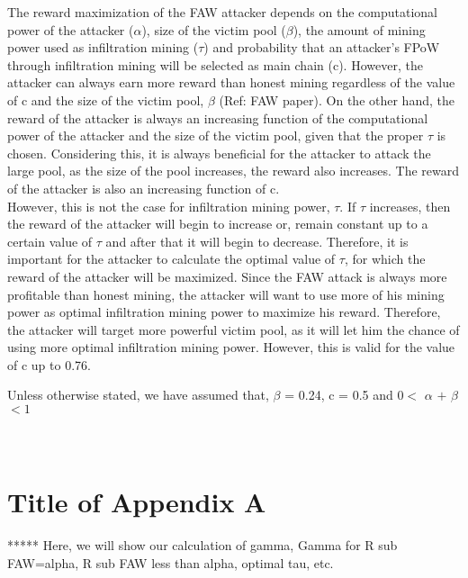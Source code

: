 \documentclass[runningheads]{llncs}
\begin{document}
The reward maximization of the FAW attacker depends on the computational power of the attacker ($\alpha$), size of the victim pool ($\beta$), the amount of mining power used as infiltration mining ($\tau$) and probability that an attacker’s FPoW through infiltration mining will be selected as main chain (c). However, the attacker can always earn more reward than honest mining regardless of the value of c and the size of the victim pool, $\beta$ (Ref: FAW paper). On the other hand, the reward of the attacker is always an increasing function of the computational power of the attacker and the size of the victim pool, given that the proper $\tau$ is chosen. Considering this, it is always beneficial for the attacker to attack the large pool, as the size of the pool increases, the reward also increases. The reward of the attacker is also an increasing function of c.  \\


However, this is not the case for infiltration mining power, $\tau$. If $\tau$ increases, then the reward of the attacker will begin to increase or, remain constant up to a certain value of $\tau$ and after that it will begin to decrease. Therefore, it is important for the attacker to calculate the optimal value of $\tau$, for which the reward of the attacker will be maximized. Since the FAW attack is always more profitable than honest mining, the attacker will want to use more of his mining power as optimal infiltration mining power to maximize his reward. Therefore, the attacker will target more powerful victim pool, as it will let him the chance of using more optimal infiltration mining power. However, this is valid for the value of c up to 0.76. 

Unless otherwise stated, we have assumed that, $\beta$ = 0.24, c = 0.5 and $ 0 < $ $\alpha$ $+$ $\beta$ $< 1$




\appendix
\section{\\Title of Appendix A}
***** Here, we will show our calculation of gamma, Gamma for R sub FAW=alpha, R sub FAW less than alpha, optimal tau, etc.
\end{document}
